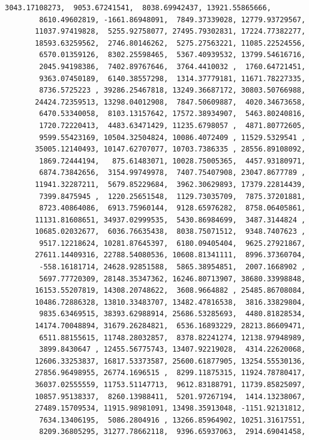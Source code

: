 \documentclass[11pt,a4paper]{report}
\begin{document}
\begin{tcolorbox}[breakable, size=fbox, boxrule=.5pt, pad at break*=1mm, opacityfill=0]
\begin{Verbatim}[commandchars=\\\{\}]
        3043.17108273,  9053.67241541,  8038.69942437, 13921.55865666,
        8610.49602819, -1661.86948091,  7849.37339028, 12779.93729567,
       11037.97419828,  5255.92758077, 27495.79302831, 17224.77382277,
       18593.63259562,  2746.80146262,  5275.27563221, 11085.22524556,
        6570.01359126,  8302.25598465,  5367.40939532, 13799.54616716,
        2045.94198386,  7402.89767646,  3764.4410032 ,  1760.64721451,
        9363.07450189,  6140.38557298,  1314.37779181, 11671.78227335,
        8736.5725223 , 39286.25467818, 13249.36687172, 30803.50766988,
       24424.72359513, 13298.04012908,  7847.50609887,  4020.34673658,
        6470.53340058,  8103.13157642, 17572.38934907,  5463.80240816,
        1720.72220413,  4483.63471429, 11235.6798057 ,  4871.80772605,
        9599.55423169, 10504.32504824, 10086.4072409 , 11529.5329541 ,
       35005.12140493, 10147.62707077, 10703.7386335 , 28556.89108092,
        1869.72444194,   875.61483071, 10028.75005365,  4457.93180971,
        6874.73842656,  3154.99749978,  7407.75407908, 23047.8677789 ,
       11941.32287211,  5679.85229684,  3962.30629893, 17379.22814439,
        7399.8475945 ,  1220.25651548,  1129.73035709,  7875.37201881,
        8723.40864086,  6913.75960144,  9128.65976282,  8758.06405861,
       11131.81608651, 34937.02999535,  5430.86984699,  3487.3144824 ,
       10685.02032677,  6036.76635438,  8038.75071512,  9348.7407623 ,
        9517.12218624, 10281.87645397,  6180.09405404,  9625.27921867,
       27611.14409316, 22788.54080536, 10608.81341111,  8996.37360704,
        -558.16181714, 24628.92851588,  5865.38954851,  2007.1668902 ,
        5697.77720309, 28148.35347362, 16246.80713907, 38680.33998848,
       16153.55207819, 14308.20748622,  3608.9664882 , 25485.86708084,
       10486.72886328, 13810.33483707, 13482.47816538,  3816.33829804,
        9835.63469515, 38393.62988914, 25686.53285693,  4480.81828534,
       14174.70048894, 31679.26284821,  6536.16893229, 28213.86609471,
        6511.88155615, 11748.28032857,  8378.82241274, 12138.97948989,
        3899.8430647 , 12455.56775743, 13407.92219028,  4314.22620068,
       12606.33253837, 16817.53373587, 25600.61877905, 13254.55530136,
       27856.96498955, 26774.1696515 ,  8299.11875315, 11924.78780417,
       36037.02555559, 11753.51147713,  9612.83188791, 11739.85825097,
       10857.95138337,  8260.13988411,  5201.97267194,  1414.13238067,
       27489.15709534, 11915.98981091, 13498.35913048, -1151.92131812,
        7634.13406195,  5086.2804916 , 13266.85964902, 10251.31617551,
        8209.36805295, 31277.78662118,  9396.65937063,  2914.69041458,

\end{Verbatim}
\end{tcolorbox}
\end{document}
